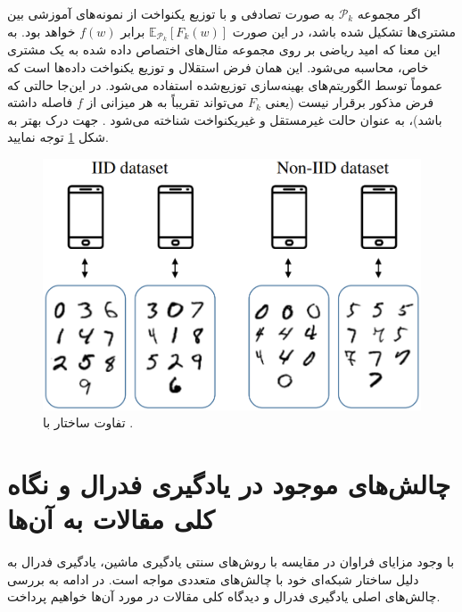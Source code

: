 اگر مجموعه 
$\mathcal{P}_k$ 
به صورت تصادفی و با توزیع یکنواخت%
از نمونه‌های آموزشی بین مشتری‌ها تشکیل شده باشد، در این صورت 
$\mathbb{E}_{\mathcal{P}_k}\left[F_k(w)\right]$ 
برابر
$f(w)$ 
خواهد بود. به این معنا که امید ریاضی بر روی مجموعه مثال‌های اختصاص داده شده به یک مشتری خاص، محاسبه می‌شود.
این همان فرض
استقلال و توزیع یکنواخت داده‌ها%
است که عموماً توسط الگوریتم‌های بهینه‌سازی توزیع‌شده استفاده می‌شود. در این‌جا حالتی که فرض مذکور برقرار نیست (یعنی
$F_k$
می‌تواند تقریباً به هر میزانی از
$f$
فاصله داشته باشد)، به عنوان حالت
غیرمستقل و غیریکنواخت
شناخته می‌شود
\cite{mcmahan2017communication}.
جهت درک بهتر به شکل
\ref{iid_vs_noniid}
توجه نمایید.


\begin{figure}[t]
	\centering
	\includegraphics[scale=0.4]{images/chap2/iid_vs_noniid.png}%
	\caption{%
		تفاوت ساختار
		با
		\cite{hellström2022wirelessmachinelearning}.
	}
	\label{iid_vs_noniid}
	\centering
\end{figure}



\section{چالش‌های موجود در یادگیری فدرال و نگاه کلی مقالات به آن‌ها}
با وجود مزایای فراوان در مقایسه با روش‌های سنتی یادگیری ماشین، یادگیری فدرال به دلیل ساختار شبکه‌ای خود با چالش‌های متعددی مواجه است. در ادامه به بررسی چالش‌های اصلی یادگیری فدرال و دیدگاه کلی مقالات در مورد آن‌ها خواهیم پرداخت.


